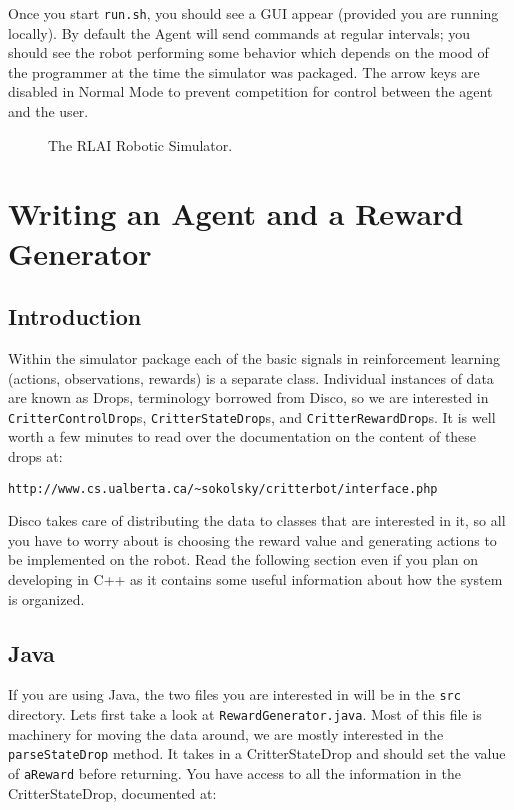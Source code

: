 \documentclass[12pt]{article}
\begin{document}
Once you start \verb+run.sh+, you should see a GUI appear (provided you are
running locally). By default the Agent will send commands at regular intervals;
you should see the robot performing some behavior which depends on the mood
of the programmer at the time the simulator was packaged. The arrow keys are
disabled in Normal Mode to prevent competition for control between the agent
and the user. 

\begin{figure}
\centerline{
}
\caption{The RLAI Robotic Simulator.}
\end{figure}

\section{Writing an Agent and a Reward Generator}

\subsection{Introduction}\label{subsec:programming_introduction}

Within the simulator package each of the basic signals in reinforcement learning (actions, observations, rewards) is a separate class.  Individual instances of data are known as Drops, terminology borrowed from Disco, so we are interested in \verb+CritterControlDrop+s, \verb+CritterStateDrop+s, and \verb+CritterRewardDrop+s.  It is well worth a few minutes to read over the documentation on the content of these drops at:

\begin{verbatim}
http://www.cs.ualberta.ca/~sokolsky/critterbot/interface.php
\end{verbatim}

Disco takes care of distributing the data to classes that are interested in it, so all you have to worry about is choosing the reward value and generating actions to be implemented on the robot.  Read the following section even if you plan on developing in C++ as it contains some useful information about how the system is organized.

\subsection{Java}\label{subsec:java_agent}

If you are using Java, the two files you are interested in will be in the \verb+src+ directory.  Lets first take a look at \verb+RewardGenerator.java+.  Most of this file is machinery for moving the data around, we are mostly interested in the \verb+parseStateDrop+ method.  It takes in a CritterStateDrop and should set the value of \verb+aReward+ before returning.  You have access to all the information in the CritterStateDrop, documented at:
\end{document}
